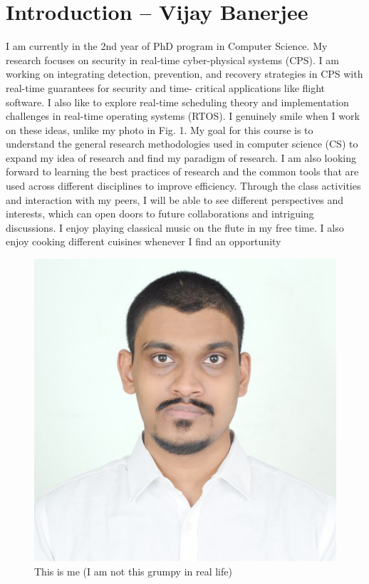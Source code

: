 \section{Introduction -- Vijay Banerjee}
I am currently in the 2nd year of PhD program in Computer Science. My research focuses on
security in real-time cyber-physical systems (CPS). I am working on integrating detection,
prevention, and recovery strategies in CPS with real-time guarantees for security and time-
critical applications like flight software. I also like to explore real-time scheduling theory and
implementation challenges in real-time operating systems (RTOS). I genuinely smile when I work on these
ideas, unlike my photo in Fig. 1.
My goal for this course is to understand the general research methodologies used in computer
science (CS) to expand my idea of research and find my paradigm
of research. I am also looking forward to learning the best practices of research and the
common tools that are used across different disciplines to improve efficiency. Through the
class activities and interaction with my peers, I will be able to see different perspectives and
interests, which can open doors to future collaborations and intriguing discussions.
I enjoy playing classical music on the flute in my free time. I also enjoy cooking different
cuisines whenever I find an opportunity
\begin{figure}[h]
    \centering
    \includegraphics{banerjee.jpeg}
    \caption{This is me (I am not this grumpy in real life)}
    \label{fig:me}
\end{figure}



